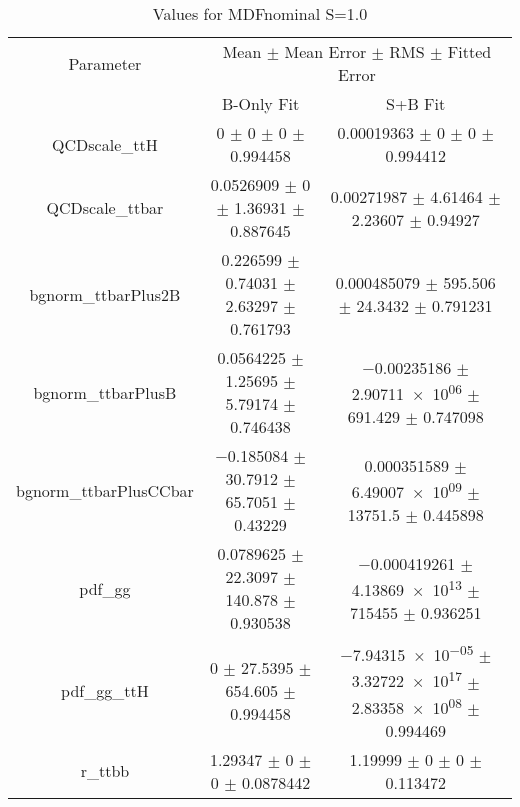 \begin{table}
\centering
\caption{Values for MDFnominal S=1.0}
\begin{tabular}{ccc}
\toprule
Parameter & \multicolumn{2}{c}{Mean $\pm$ Mean Error $\pm$ RMS $\pm$ Fitted Error}\\
 & B-Only Fit & S+B Fit\\
\midrule
QCDscale\_ttH & \num{0} $\pm$ \num{0} $\pm$ \num{0} $\pm$ \num{0.994458} & \num{0.00019363} $\pm$ \num{0} $\pm$ \num{0} $\pm$ \num{0.994412}\\
QCDscale\_ttbar & \num{0.0526909} $\pm$ \num{0} $\pm$ \num{1.36931} $\pm$ \num{0.887645} & \num{0.00271987} $\pm$ \num{4.61464} $\pm$ \num{2.23607} $\pm$ \num{0.94927}\\
bgnorm\_ttbarPlus2B & \num{0.226599} $\pm$ \num{0.74031} $\pm$ \num{2.63297} $\pm$ \num{0.761793} & \num{0.000485079} $\pm$ \num{595.506} $\pm$ \num{24.3432} $\pm$ \num{0.791231}\\
bgnorm\_ttbarPlusB & \num{0.0564225} $\pm$ \num{1.25695} $\pm$ \num{5.79174} $\pm$ \num{0.746438} & \num{-0.00235186} $\pm$ \num{2.90711e+06} $\pm$ \num{691.429} $\pm$ \num{0.747098}\\
bgnorm\_ttbarPlusCCbar & \num{-0.185084} $\pm$ \num{30.7912} $\pm$ \num{65.7051} $\pm$ \num{0.43229} & \num{0.000351589} $\pm$ \num{6.49007e+09} $\pm$ \num{13751.5} $\pm$ \num{0.445898}\\
pdf\_gg & \num{0.0789625} $\pm$ \num{22.3097} $\pm$ \num{140.878} $\pm$ \num{0.930538} & \num{-0.000419261} $\pm$ \num{4.13869e+13} $\pm$ \num{715455} $\pm$ \num{0.936251}\\
pdf\_gg\_ttH & \num{0} $\pm$ \num{27.5395} $\pm$ \num{654.605} $\pm$ \num{0.994458} & \num{-7.94315e-05} $\pm$ \num{3.32722e+17} $\pm$ \num{2.83358e+08} $\pm$ \num{0.994469}\\
r\_ttbb & \num{1.29347} $\pm$ \num{0} $\pm$ \num{0} $\pm$ \num{0.0878442} & \num{1.19999} $\pm$ \num{0} $\pm$ \num{0} $\pm$ \num{0.113472}\\
\bottomrule
\end{tabular}
\end{table}
